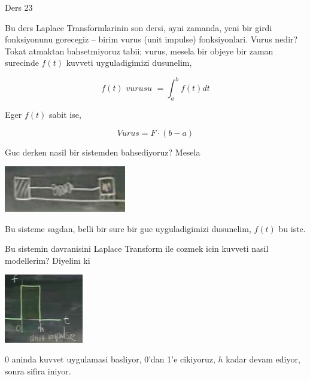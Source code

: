 \documentclass[12pt,fleqn]{article}
\begin{document}
Ders 23 

Bu ders Laplace Transformlarinin son dersi, ayni zamanda, yeni bir girdi
fonksiyonunu gorecegiz -- birim vurus (unit impulse) fonksiyonlari. Vurus
nedir? Tokat atmaktan bahsetmiyoruz tabii; vurus, mesela bir objeye bir zaman
surecinde $f(t)$ kuvveti uyguladigimizi dusunelim, 

\[ f(t) \textit{ vurusu } = \int _{a}^{b}f(t)dt \]

Eger $f(t)$ sabit ise, 

\[ Vurus = F \cdot (b-a) \]

Guc derken nasil bir sistemden bahsediyoruz? Mesela

\includegraphics[height=2cm]{23_1.png}

Bu sisteme sagdan, belli bir sure bir guc uyguladigimizi dusunelim, $f(t)$
bu iste. 

Bu sistemin davranisini Laplace Transform ile cozmek icin kuvveti nasil
modellerim? Diyelim ki 

\includegraphics[height=3cm]{23_2.png}

0 aninda kuvvet uygulamasi basliyor, 0'dan 1'e cikiyoruz, $h$ kadar devam
ediyor, sonra sifira iniyor. 
\end{document}
